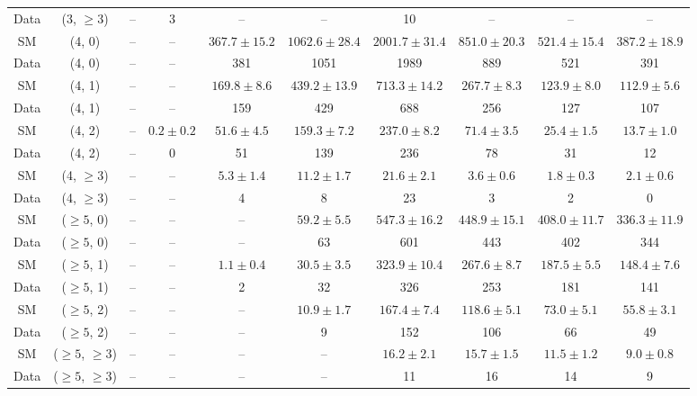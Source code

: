 \begin{table}[h!]
{\begin{tabular}{cccccccccc}
	Data & (3, $\ge3$) & -- & 3 & -- & -- & 10 & -- & -- & -- \\[0.5ex] 
	SM & (4, 0) & -- & -- & $367.7\pm 15.2$ & $1062.6\pm 28.4$ & $2001.7\pm 31.4$ & $851.0\pm 20.3$ & $521.4\pm 15.4$ & $387.2\pm 18.9$ \\[0.5ex] 
	Data & (4, 0) & -- & -- & 381 & 1051 & 1989 & 889 & 521 & 391 \\[0.5ex] 
	SM & (4, 1) & -- & -- & $169.8\pm 8.6$ & $439.2\pm 13.9$ & $713.3\pm 14.2$ & $267.7\pm 8.3$ & $123.9\pm 8.0$ & $112.9\pm 5.6$ \\[0.5ex] 
	Data & (4, 1) & -- & -- & 159 & 429 & 688 & 256 & 127 & 107 \\[0.5ex] 
	SM & (4, 2) & -- & $0.2\pm 0.2$ & $51.6\pm 4.5$ & $159.3\pm 7.2$ & $237.0\pm 8.2$ & $71.4\pm 3.5$ & $25.4\pm 1.5$ & $13.7\pm 1.0$ \\[0.5ex] 
	Data & (4, 2) & -- & 0 & 51 & 139 & 236 & 78 & 31 & 12 \\[0.5ex] 
	SM & (4, $\ge3$) & -- & -- & $5.3\pm 1.4$ & $11.2\pm 1.7$ & $21.6\pm 2.1$ & $3.6\pm 0.6$ & $1.8\pm 0.3$ & $2.1\pm 0.6$ \\[0.5ex] 
	Data & (4, $\ge3$) & -- & -- & 4 & 8 & 23 & 3 & 2 & 0 \\[0.5ex] 
	SM & ($\ge5$, 0) & -- & -- & -- & $59.2\pm 5.5$ & $547.3\pm 16.2$ & $448.9\pm 15.1$ & $408.0\pm 11.7$ & $336.3\pm 11.9$ \\[0.5ex] 
	Data & ($\ge5$, 0) & -- & -- & -- & 63 & 601 & 443 & 402 & 344 \\[0.5ex] 
	SM & ($\ge5$, 1) & -- & -- & $1.1\pm 0.4$ & $30.5\pm 3.5$ & $323.9\pm 10.4$ & $267.6\pm 8.7$ & $187.5\pm 5.5$ & $148.4\pm 7.6$ \\[0.5ex] 
	Data & ($\ge5$, 1) & -- & -- & 2 & 32 & 326 & 253 & 181 & 141 \\[0.5ex] 
	SM & ($\ge5$, 2) & -- & -- & -- & $10.9\pm 1.7$ & $167.4\pm 7.4$ & $118.6\pm 5.1$ & $73.0\pm 5.1$ & $55.8\pm 3.1$ \\[0.5ex] 
	Data & ($\ge5$, 2) & -- & -- & -- & 9 & 152 & 106 & 66 & 49 \\[0.5ex] 
	SM & ($\ge5$, $\ge3$) & -- & -- & -- & -- & $16.2\pm 2.1$ & $15.7\pm 1.5$ & $11.5\pm 1.2$ & $9.0\pm 0.8$ \\[0.5ex] 
	Data & ($\ge5$, $\ge3$) & -- & -- & -- & -- & 11 & 16 & 14 & 9 \\[0.5ex] 
	\hline
	\hline
\end{tabular}}
\end{table}
